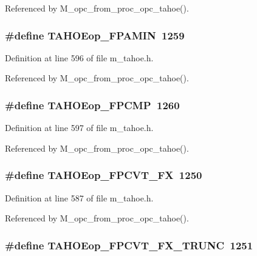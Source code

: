 Referenced by M\_\-opc\_\-from\_\-proc\_\-opc\_\-tahoe().
\subsubsection{\setlength{\rightskip}{0pt plus 5cm}\#define TAHOEop\_\-FPAMIN~1259}\label{m__tahoe_8h_a7d0ff626f0b07375a402b992181aa57}




Definition at line 596 of file m\_\-tahoe.h.

Referenced by M\_\-opc\_\-from\_\-proc\_\-opc\_\-tahoe().
\subsubsection{\setlength{\rightskip}{0pt plus 5cm}\#define TAHOEop\_\-FPCMP~1260}\label{m__tahoe_8h_c8dbdc3f7dce74dd4a8b322696b5d243}




Definition at line 597 of file m\_\-tahoe.h.

Referenced by M\_\-opc\_\-from\_\-proc\_\-opc\_\-tahoe().
\subsubsection{\setlength{\rightskip}{0pt plus 5cm}\#define TAHOEop\_\-FPCVT\_\-FX~1250}\label{m__tahoe_8h_fea21e6b403bd6c8c8a96df6378cfa63}




Definition at line 587 of file m\_\-tahoe.h.

Referenced by M\_\-opc\_\-from\_\-proc\_\-opc\_\-tahoe().
\subsubsection{\setlength{\rightskip}{0pt plus 5cm}\#define TAHOEop\_\-FPCVT\_\-FX\_\-TRUNC~1251}\label{m__tahoe_8h_74855e7ba27238b4fd3f4001a8162cd6}





